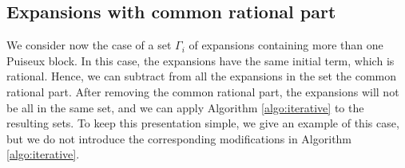 \documentclass[a4paper,11pt]{amsart}%
\theoremstyle{definition}
\theoremstyle{plain}
\theoremstyle{remark}
\begin{document}

\subsection{Expansions with common rational part}

We consider now the case of a set $\Gamma_i$ of expansions containing more than one Puiseux block. In this case, the expansions have the same initial term, which is rational. Hence, we can subtract from all the expansions in the set the common rational part. After removing the common rational part, the expansions will not be all in the same set, and we can apply Algorithm \ref{algo:iterative} to the resulting sets. To keep this presentation simple, we give an example of this case, but we do not introduce the corresponding modifications in Algorithm \ref{algo:iterative}.
\end{document}
